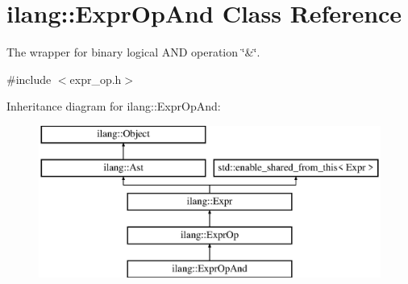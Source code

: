 \hypertarget{classilang_1_1_expr_op_and}{}\section{ilang\+:\+:Expr\+Op\+And Class Reference}
\label{classilang_1_1_expr_op_and}


The wrapper for binary logical A\+ND operation \char`\"{}\&\char`\"{}.  




{\ttfamily \#include $<$expr\+\_\+op.\+h$>$}

Inheritance diagram for ilang\+:\+:Expr\+Op\+And\+:\begin{figure}[H]
\begin{center}
\leavevmode
\includegraphics[height=5.000000cm]{classilang_1_1_expr_op_and}
\end{center}
\end{figure}
